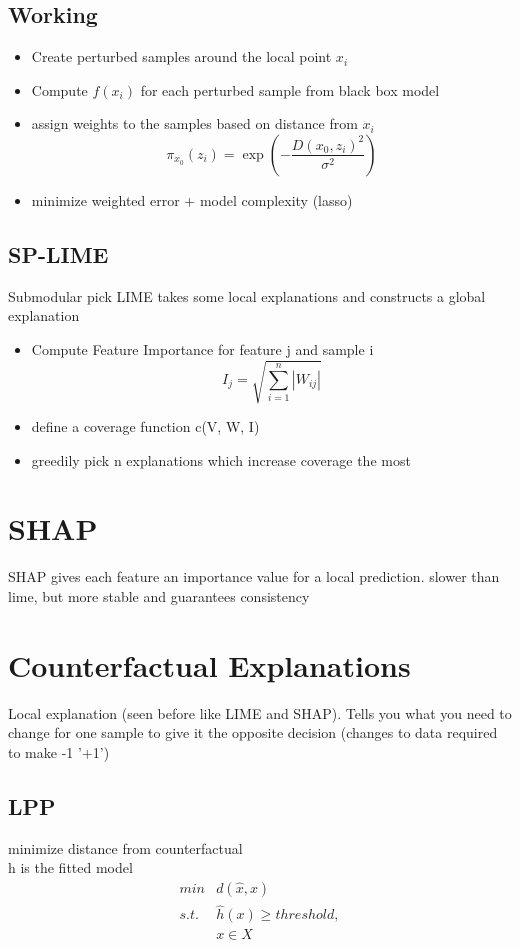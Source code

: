 \documentclass[11pt]{article}
\theoremstyle{definition}
\begin{document}
\subsection{Working}
\begin{itemize}
    \item Create perturbed samples around the local point $x_i$
    \item Compute $f(x_i)$ for each perturbed sample from black box model
    \item assign weights to the samples based on distance from $x_i$
    \begin{equation*}
       \pi_{x_0}(z_i) = \exp\left(-\frac{D(x_0, z_i)^2}{\sigma^2}\right) 
    \end{equation*}
    \item minimize weighted error + model complexity (lasso)

\end{itemize}
\subsection{SP-LIME}
Submodular pick LIME takes some local explanations and constructs a global explanation
\begin{itemize}
    \item Compute Feature Importance for feature j and sample i
    \begin{equation*}
        I_j = \sqrt{\sum_{i=1}^n |W_{ij}|}
    \end{equation*}
    \item define a coverage function c(V, W, I)
    \item greedily pick n explanations which increase coverage the most
    
\end{itemize}
\section{SHAP}
SHAP gives each feature an importance value for a local prediction.
slower than lime, but more stable and guarantees consistency
\section{Counterfactual Explanations}
Local explanation (seen before like LIME and SHAP). Tells you what you need to change for one sample to give it the opposite decision (changes to data required to make -1 '+1')
\subsection{LPP}
minimize distance from counterfactual \\
h is the fitted model
\begin{align*}
  min& d(\hat{x}, x) \\
  s.t.& \hat{h}(x) \geq threshold,\\
  &x \in X
\end{align*}
\end{document}
